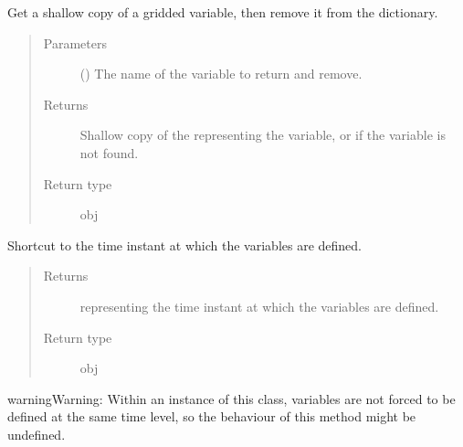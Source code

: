 \documentclass[letterpaper,10pt,english]{sphinxmanual}
\begin{document}
\begin{fulllineitems}

\begin{fulllineitems}
\label{\detokenize{api:tasmania.storages.grid_data.GridData.pop}}
Get a shallow copy of a gridded variable, then remove it from the dictionary.
\begin{quote}\begin{description}
\item[{Parameters}] \leavevmode
{} () \textendash{} The name of the variable to return and remove.

\item[{Returns}] \leavevmode
Shallow copy of the  representing the variable,
or  if the variable is not found.

\item[{Return type}] \leavevmode
obj

\end{description}\end{quote}

\end{fulllineitems}


\begin{fulllineitems}
\label{\detokenize{api:tasmania.storages.grid_data.GridData.time}}
Shortcut to the time instant at which the variables are defined.
\begin{quote}\begin{description}
\item[{Returns}] \leavevmode
{} representing the time instant at which the variables are defined.

\item[{Return type}] \leavevmode
obj

\end{description}\end{quote}

\begin{sphinxadmonition}{warning}{Warning:}
Within an instance of this class, variables are not forced to be defined at the same time level,
so the behaviour of this method might be undefined.
\end{sphinxadmonition}


\end{fulllineitems}
\end{fulllineitems}
\end{document}
